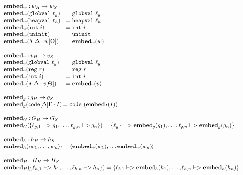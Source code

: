{\footnotesize
\[\begin{array}{l}
\begin{array}{ll}
\rlap{$\embed_w : \high w -> \simple{w}$} \\
\embed_w(\mathtt{globval}\ \ell_g) &= \mathtt{globval}\ \ell_g \\
\embed_w(\mathtt{heapval}\ \ell_h) &= \mathtt{heapval}\ \ell_h \\
\embed_w(\mathtt{int}\ i) &= \mathtt{int}\ i \\
\embed_w(\mathtt{uninit}) &= \mathtt{uninit} \\
\embed_w(\Lambda\ \Delta \cdot w[\Theta]) &= \embed_w(w) \\\\

\rlap{$\embed_v : \high v -> \simple{v}$} \\
\embed_v(\mathtt{globval}\ \ell_g) &= \mathtt{globval}\ \ell_g \\
\embed_v(\mathtt{reg}\ r) &= \mathtt{reg}\ r \\
\embed_v(\mathtt{int}\ i) &= \mathtt{int}\ i \\
\embed_v(\Lambda\ \Delta \cdot v[\Theta]) &= \embed_v(v)
\end{array} \\\\

\begin{array}{l}
\embed_g : \high g -> \simple{g} \\
\embed_g(\mathtt{code}[\Delta]\Gamma \cdot I) = \mathtt{code}\ (\embed_I(I)) \\\\

\embed_G : \high G -> \simple{G} \\
\embed_G(\{\ell_{g,1} |-> g_1, \dots, \ell_{g,n} |-> g_n\}) = \{\ell_{g,1} |-> \embed_g(g_1), \dots, \ell_{g,n} |-> \embed_g(g_n)\} \\\\

\embed_h : \high h -> \simple{h} \\
\embed_h(\langle w_1, \dots, w_n \rangle) = \langle \embed_w(w_1), \dots \embed_w(w_n)\rangle \\\\

\embed_H : \high H -> \simple{H} \\
\embed_H(\{\ell_{h,1} |-> h_1, \dots, \ell_{h,n} |-> h_n\}) = \{\ell_{h,1} |-> \embed_h(h_1), \dots, \ell_{h,n} |-> \embed_h(h_n)\}
\end{array} \\\\


\end{array}\]}
